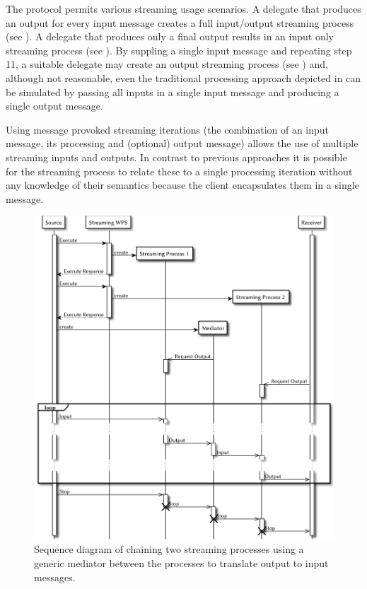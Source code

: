   The protocol permits various streaming usage scenarios. A delegate that produces an output for every input message creates a full input/output streaming process (see ). A delegate that produces only a final output results in an input only streaming process (see ). By suppling a single input message and repeating step 11, a suitable delegate may create an output streaming process (see ) and, although not reasonable, even the traditional processing approach depicted in  can be simulated by passing all inputs in a single input message and producing a single output message.

  Using message provoked streaming iterations (the combination of an input message, its processing and (optional) output message) allows the use of multiple streaming inputs and outputs. In contrast to previous approaches it is possible for the streaming process to relate these to a single processing iteration without any knowledge of their semantics because the client encapsulates them in a single message.

  \begin{figure}[!htb]
    \centering
    \includegraphics[width = 1\linewidth]{figures/sequence-diagram-chain.pdf}
    \caption{\label{fig:sd:chain}Sequence diagram of chaining two streaming processes using a generic mediator between the processes to translate output to input messages.}
  \end{figure}

